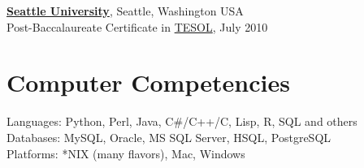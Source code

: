 \documentclass{res}
\begin{document}
\begin{resume}
\href{http://www.seattleu.edu/coe/}{\textbf{Seattle University}}, Seattle, Washington USA\\
Post-Baccalaureate Certificate in \href{http://www.schooloftesl.com/}{TESOL}, July 2010

\section{Computer Competencies} 
Languages: Python, Perl, Java, C\#/C++/C, Lisp, R, SQL and others\\
Databases: MySQL, Oracle, MS SQL Server, HSQL, PostgreSQL\\
Platforms: *NIX (many flavors), Mac, Windows

\end{resume}
\end{document}
